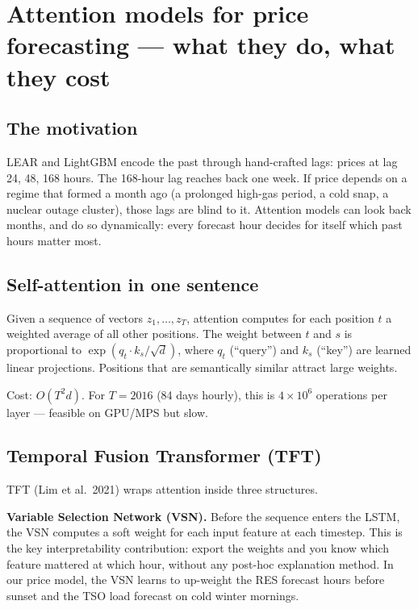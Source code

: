 \section{Attention models for price forecasting --- what they do, what they cost}

\subsection{The motivation}

LEAR and LightGBM encode the past through hand-crafted lags: prices at
lag 24, 48, 168 hours. The 168-hour lag reaches back one week. If price
depends on a regime that formed a month ago (a prolonged high-gas period,
a cold snap, a nuclear outage cluster), those lags are blind to it.
Attention models can look back months, and do so dynamically:
every forecast hour decides for itself which past hours matter most.

\subsection{Self-attention in one sentence}

Given a sequence of vectors $z_1, \ldots, z_T$, attention computes for
each position $t$ a weighted average of all other positions. The weight
between $t$ and $s$ is proportional to $\exp(q_t \cdot k_s / \sqrt{d})$,
where $q_t$ (``query'') and $k_s$ (``key'') are learned linear projections.
Positions that are semantically similar attract large weights.

Cost: $O(T^2 d)$. For $T = 2016$ (84 days hourly), this is $4 \times 10^6$
operations per layer --- feasible on GPU/MPS but slow.

\subsection{Temporal Fusion Transformer (TFT)}

TFT (Lim et al.\ 2021) wraps attention inside three structures.

\textbf{Variable Selection Network (VSN).} Before the sequence enters
the LSTM, the VSN computes a soft weight for each input feature at each
timestep. This is the key interpretability contribution: export the
weights and you know which feature mattered at which hour, without any
post-hoc explanation method. In our price model, the VSN learns to
up-weight the RES forecast hours before sunset and the TSO load forecast
on cold winter mornings.

